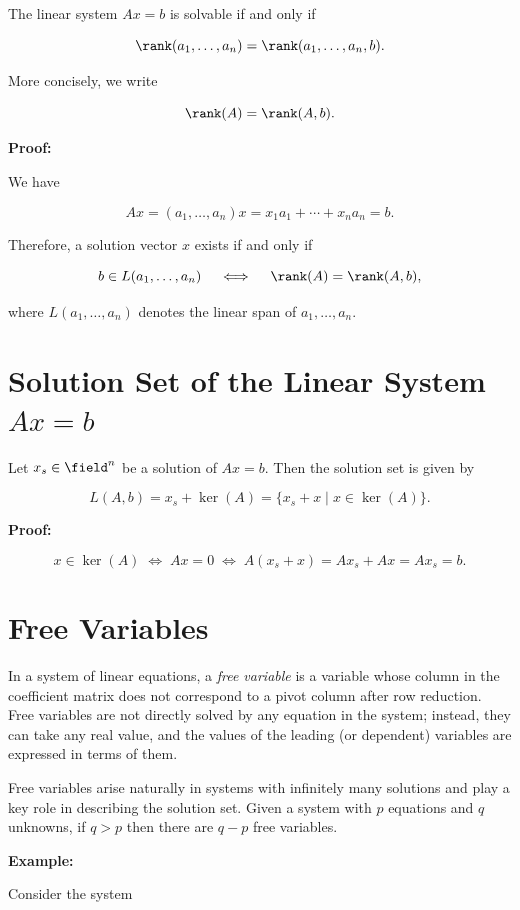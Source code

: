 The linear system \(Ax = b\) is solvable if and only if

\[
    \rank(a_1, \ldots, a_n) = \rank(a_1, \ldots, a_n, b).
\]

More concisely, we write

\[
    \rank(A) = \rank(A, b).
\]

\textbf{Proof:}

We have

\[
    Ax = (a_1, \ldots, a_n)x = x_1 a_1 + \cdots + x_n a_n = b.
\]

Therefore, a solution vector \(x\) exists if and only if

\[
    b \in L(a_1, \ldots, a_n) \quad \iff \quad \rank(A) = \rank(A, b),
\]

where \(L(a_1, \ldots, a_n)\) denotes the linear span of \(a_1, \ldots, a_n\).

\section{Solution Set of the Linear System \texorpdfstring{\(Ax = b\)}{}}

Let \(x_s \in \field^n\) be a solution of \(Ax = b\). Then the solution set is given by

\[
    L(A, b) = x_s + \ker(A) = \{x_s + x \mid x \in \ker(A)\}.
\]

\textbf{Proof:}

\[
    x \in \ker(A) \;\iff\; Ax = 0 \;\iff\; A(x_s + x) = Ax_s + Ax = Ax_s = b.
\]

\section{Free Variables}

In a system of linear equations, a \emph{free variable} is a variable whose column in the coefficient matrix does not correspond to a pivot column 
after row reduction. Free variables are not directly solved by any equation in the system; instead, they can take any real value, and the values of 
the leading (or dependent) variables are expressed in terms of them.

Free variables arise naturally in systems with infinitely many solutions and play a key role in describing the solution set. Given a system with 
\(p\) equations and \(q\) unknowns, if \(q > p\) then there are \(q - p\) free variables.

\textbf{Example:}

Consider the system

